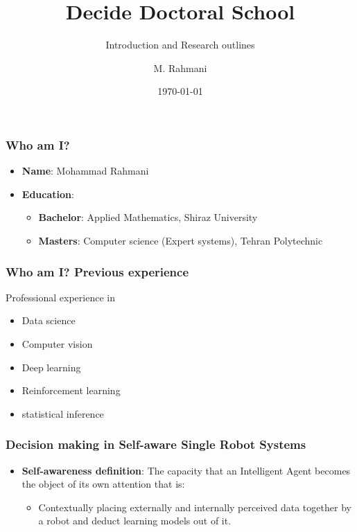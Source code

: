 \documentclass{beamer}
\title{Decide Doctoral School}
\subtitle{Introduction and Research outlines}
\author{M. Rahmani}
\institute{University of Klagenfurt}
\date{\today}
\begin{document}
	\begin{frame}
		\titlepage
	\end{frame}
	\begin{frame}
		\frametitle{Who am I?}		
		\begin{itemize}
			\item \textbf{Name}: Mohammad Rahmani
			\item \textbf{Education}:
				\begin{itemize}
					\item \textbf{Bachelor}: Applied Mathematics, Shiraz University
					\item \textbf{Masters}: Computer science (Expert systems), Tehran Polytechnic
				\end{itemize}
		\end{itemize}		
	\end{frame}
	
	\begin{frame}
		\frametitle{Who am I? Previous experience}		
		Professional experience in
		\begin{itemize}
			\item Data science
			\item Computer vision
			\item Deep learning
			\item Reinforcement learning
			\item statistical inference
		\end{itemize}		
	\end{frame}
	
	\begin{frame}
		\frametitle{Decision making in Self-aware Single Robot Systems}
		\begin{itemize}
			\item \textbf{Self-awareness definition}: The capacity that an Intelligent Agent becomes the object of its own attention that is:
				\begin{itemize}
					\item Contextually placing externally and internally perceived data together by a robot and deduct learning models out of it.
				\end{itemize}   
		\end{itemize}		
	\end{frame}
\end{document}
